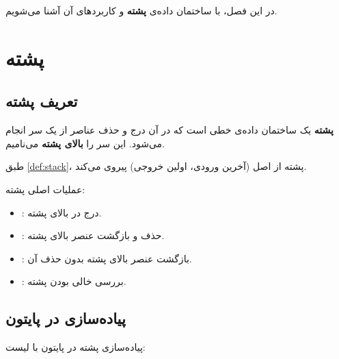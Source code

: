 در این فصل، با ساختمان داده‌ی \textbf{پشته}
و کاربردهای آن آشنا می‌شویم.


\section{پشته}
\label{sec:programming-book-stack}

\subsection{تعریف پشته}
\label{sec:programming-book-stack-def}

\begin{definition}[پشته]
    \textbf{پشته} یک ساختمان
    داده‌ی خطی است که در آن درج و حذف
    عناصر از یک سر انجام می‌شود. این
    سر را \textbf{بالای پشته} می‌نامیم.
    \label{def:stack}
\end{definition}

طبق \cref{def:stack}، پشته از اصل
\textbf{} (آخرین
ورودی، اولین خروجی) پیروی می‌کند.

\begin{example}
    عملیات اصلی پشته:
    \begin{itemize}
        \item {}: درج  در
        بالای پشته.
        \item {}: حذف و بازگشت عنصر
        بالای پشته.
        \item {}: بازگشت عنصر بالای
        پشته بدون حذف آن.
        \item {}: بررسی خالی بودن
        پشته.
    \end{itemize}
    \label{ex:stack-operations}
\end{example}

\subsection{پیاده‌سازی در پایتون}
\label{sec:programming-book-python}

پیاده‌سازی پشته در پایتون با لیست:

